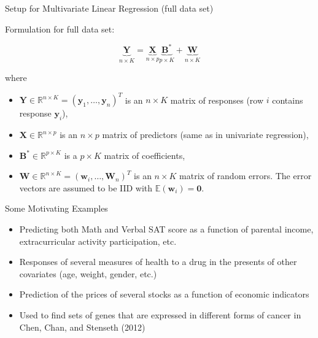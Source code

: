 \documentclass[notes]{beamer}       %
\newcommand{\E}{\mathbb{E}}
\begin{document}
\begin{frame}{Setup for Multivariate Linear Regression (full data set)}{}

   Formulation for full data set:

\begin{equation}
\underbrace{\boldsymbol{Y}}_{n \times K} = \underbrace{\boldsymbol{X}}_{n \times p} \underbrace{\boldsymbol{B}^*}_{p \times K} + \underbrace{\boldsymbol{W}}_{n \times K}
\end{equation}
  
  where

\begin{itemize}

\item \(\boldsymbol{Y} \in \mathbb{R}^{n \times K} = (\boldsymbol{y}_1, \ldots, \boldsymbol{y}_n)^T\) is an \(n \times K\) matrix of responses (row \(i\) contains response \(\boldsymbol{y}_i\)),

\item \(\boldsymbol{X} \in \mathbb{R}^{n \times p}\) is an \(n \times p\) matrix of predictors (same as in univariate regression),

\item \(\boldsymbol{B}^* \in \mathbb{R}^{p \times K}\) is a \(p \times K\) matrix of coefficients,

\item \(\boldsymbol{W} \in \mathbb{R}^{n \times K} = (\boldsymbol{w}_i, \ldots, \boldsymbol{W}_n)^T\) is an \(n \times K\) matrix of random errors. The error vectors are assumed to be IID with \(\E(\boldsymbol{w}_i) = \boldsymbol{0}\).

\end{itemize}

\end{frame}

\begin{frame}{Some Motivating Examples}{}
  \begin{itemize}
  \item Predicting both Math and Verbal SAT score as a function of parental income, extracurricular activity participation, etc.
  \item Responses of several measures of health to a drug in the presents of other covariates (age, weight, gender, etc.)
  \item Prediction of the prices of several stocks as a function of economic indicators
  \item Used to find sets of genes that are expressed in different forms of cancer in Chen, Chan, and Stenseth (2012)
  \end{itemize}
  
  \end{frame}
  
\end{document}
